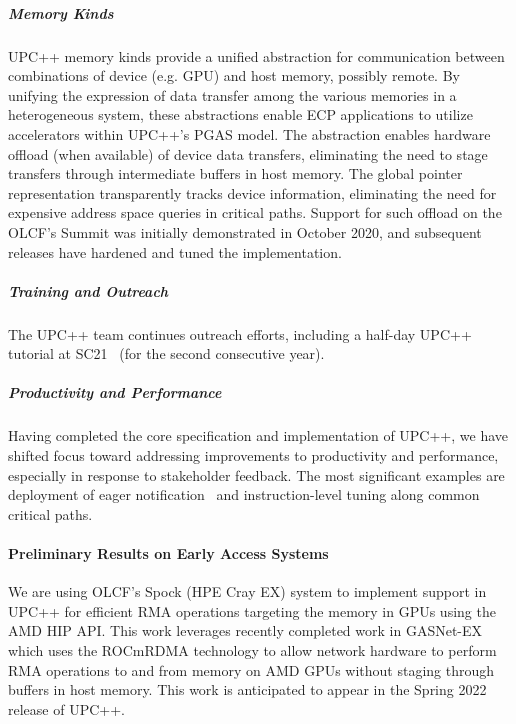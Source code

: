 \subparagraph{Memory Kinds}
UPC++ memory kinds provide a unified abstraction for communication between
combinations of device (e.g. GPU) and host memory, possibly remote.  By
unifying the expression of data transfer among the various memories in a
heterogeneous system, these abstractions enable ECP
applications to utilize accelerators within UPC++'s PGAS model.  The
abstraction enables hardware offload (when available) of device data transfers,
eliminating the need to stage transfers through
intermediate buffers in host memory.
The global pointer representation transparently tracks device information,
eliminating the need for expensive address space queries in critical paths.
Support for such offload on the OLCF's
Summit was initially demonstrated in October 2020, and subsequent releases
have hardened and tuned the implementation.

\subparagraph{Training and Outreach}
The UPC++ team continues outreach efforts, including a half-day UPC++
tutorial at SC21~\cite{sc21-upcxx-tutorial} (for the second consecutive year).

\subparagraph{Productivity and Performance}
Having completed the core specification and implementation of UPC++, we have
shifted focus toward addressing improvements to productivity and performance,
especially in response to stakeholder feedback.  The most significant
examples are deployment of eager notification~\cite{pawatm21-upcxx-as_eager} 
and instruction-level tuning along common critical paths.

\paragraph{Preliminary Results on Early Access Systems}

We are using OLCF's Spock (HPE Cray EX) system to implement support in UPC++ for efficient RMA
operations targeting the memory in GPUs using the AMD HIP API.  This work
leverages recently completed work in GASNet-EX which uses the ROCmRDMA
technology to allow network hardware to perform RMA operations to and from
memory on AMD GPUs without staging through buffers in host memory.  This work is
anticipated to appear in the Spring 2022 release of UPC++.

